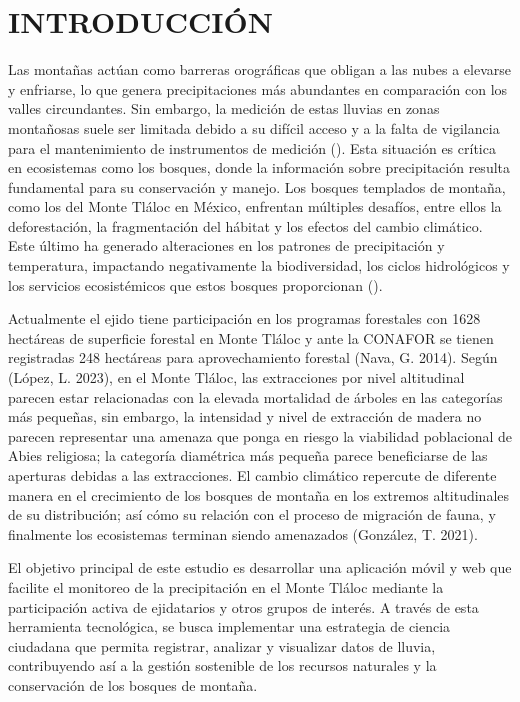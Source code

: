 \chapter{INTRODUCCIÓN}
\setcounter{page}{1}

Las montañas actúan como barreras orográficas que obligan a las nubes a elevarse y enfriarse, lo que genera precipitaciones más abundantes en comparación con los valles circundantes. Sin embargo, la medición de estas lluvias en zonas montañosas suele ser limitada debido a su difícil acceso y a la falta de vigilancia para el mantenimiento de instrumentos de medición (\cite{aparicio1992}). Esta situación es crítica en ecosistemas como los bosques, donde la información sobre precipitación resulta fundamental para su conservación y manejo. Los bosques templados de montaña, como los del Monte Tláloc en México, enfrentan múltiples desafíos, entre ellos la deforestación, la fragmentación del hábitat y los efectos del cambio climático. Este último ha generado alteraciones en los patrones de precipitación y temperatura, impactando negativamente la biodiversidad, los ciclos hidrológicos y los servicios ecosistémicos que estos bosques proporcionan (\cite{gonzalez2016}).

Actualmente el ejido tiene participación en los programas forestales con 1628 hectáreas de superficie forestal en Monte Tláloc y ante la CONAFOR se tienen registradas 248 hectáreas para aprovechamiento forestal (Nava, G. 2014). Según (López, L. 2023), en el Monte Tláloc, las extracciones por nivel altitudinal parecen estar relacionadas con la elevada mortalidad de árboles en las categorías más pequeñas, sin embargo, la intensidad y nivel de extracción de madera no parecen representar una amenaza que ponga en riesgo la viabilidad poblacional de Abies religiosa; la categoría diamétrica más pequeña parece beneficiarse de las aperturas debidas a las extracciones. El cambio climático repercute de diferente manera en el crecimiento de los bosques de montaña en los extremos altitudinales de su distribución; así cómo su relación con el proceso de migración de fauna, y finalmente los ecosistemas terminan siendo amenazados (González, T. 2021). 



El objetivo principal de este estudio es desarrollar una aplicación móvil y web que facilite el monitoreo de la precipitación en el Monte Tláloc mediante la participación activa de ejidatarios y otros grupos de interés. A través de esta herramienta tecnológica, se busca implementar una estrategia de ciencia ciudadana que permita registrar, analizar y visualizar datos de lluvia, contribuyendo así a la gestión sostenible de los recursos naturales y la conservación de los bosques de montaña.


